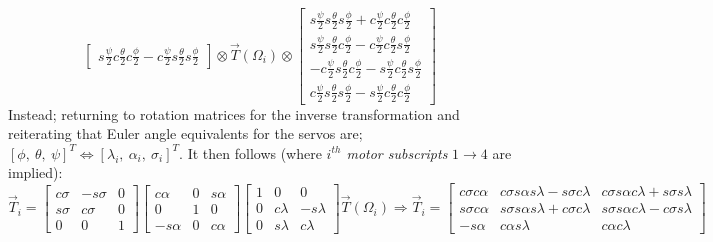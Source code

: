 {\begin{subequations}
\begin{equation}
\begin{bmatrix}
s\frac{\psi}{2}c\frac{\theta}{2}c\frac{\phi}{2}-c\frac{\psi}{2}s\frac{\theta}{2}s\frac{\phi}{2}
\end{bmatrix}
\otimes
\vec{T}(\Omega_i)
\otimes
\begin{bmatrix}
s\frac{\psi}{2}s\frac{\theta}{2}s\frac{\phi}{2}+c\frac{\psi}{2}c\frac{\theta}{2}c\frac{\phi}{2}\\
s\frac{\psi}{2}s\frac{\theta}{2}c\frac{\phi}{2}-c\frac{\psi}{2}c\frac{\theta}{2}s\frac{\phi}{2}\\
-c\frac{\psi}{2}s\frac{\theta}{2}c\frac{\phi}{2}-s\frac{\psi}{2}c\frac{\theta}{2}s\frac{\phi}{2}\\
c\frac{\psi}{2}s\frac{\theta}{2}s\frac{\phi}{2}-s\frac{\psi}{2}c\frac{\theta}{2}c\frac{\phi}{2}
\end{bmatrix}
\end{equation}
\end{subequations}
Instead; returning to rotation matrices for the inverse transformation and reiterating that Euler angle equivalents for the servos are; $[\phi,~\theta,~\psi]^T\iff [\lambda_i,~\alpha_i,~\sigma_i]^T$. It then follows (where \emph{$i^{th}$ motor subscripts} $1\rightarrow 4$ are implied):
\begin{subequations}
\begin{equation}
\vec{T}_i=\begin{bmatrix}
c\sigma & -s\sigma & 0\\
s\sigma & c\sigma & 0\\
0 & 0 & 1 
\end{bmatrix}
\begin{bmatrix}
c\alpha & 0 & s\alpha\\
0 & 1 & 0\\
-s\alpha & 0 & c\alpha
\end{bmatrix}
\begin{bmatrix}
1 & 0 & 0\\
0 & c\lambda & -s\lambda\\
0 & s\lambda & c\lambda
\end{bmatrix}\vec{T}(\Omega_i)
\end{equation}
\begin{equation}
\Rightarrow\vec{T}_i=\begin{bmatrix}
c\sigma c\alpha & c\sigma s\alpha s\lambda - s\sigma c\lambda & c\sigma s\alpha c\lambda + s\sigma s\lambda\\
s\sigma c\alpha & s\sigma s\alpha s\lambda + c\sigma c\lambda & s\sigma s\alpha c\lambda - c\sigma s\lambda\\
-s\alpha & c\alpha s\lambda & c\alpha c\lambda

\end{bmatrix}
\end{equation}
\end{subequations}}

